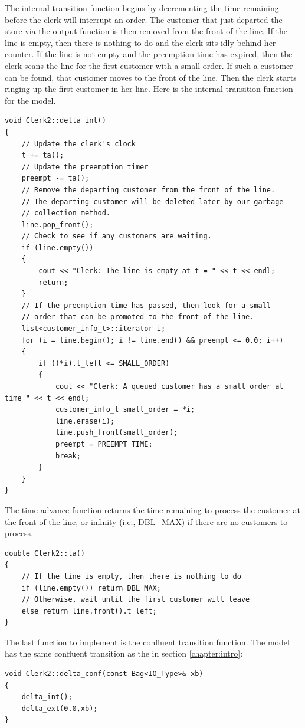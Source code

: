 The internal transition function begins by decrementing the time remaining before the clerk will interrupt an order. The customer that just departed the store via the output function is then removed from the front of the line. If the line is empty, then there is nothing to do and the clerk sits idly behind her counter. If the line is not empty and the preemption time has expired, then the clerk scans the line for the first customer with a small order. If such a customer can be found, that customer moves to the front of the line. Then the clerk starts ringing up the first customer in her line. Here is the internal transition function for the  model.
\begin{verbatim}
void Clerk2::delta_int()
{
    // Update the clerk's clock
    t += ta();
    // Update the preemption timer
    preempt -= ta();
    // Remove the departing customer from the front of the line.
    // The departing customer will be deleted later by our garbage
    // collection method.
    line.pop_front();
    // Check to see if any customers are waiting.
    if (line.empty())
    {
        cout << "Clerk: The line is empty at t = " << t << endl;
        return;
    }
    // If the preemption time has passed, then look for a small
    // order that can be promoted to the front of the line.
    list<customer_info_t>::iterator i;
    for (i = line.begin(); i != line.end() && preempt <= 0.0; i++)
    {
        if ((*i).t_left <= SMALL_ORDER)
        {
            cout << "Clerk: A queued customer has a small order at time " << t << endl;
            customer_info_t small_order = *i;
            line.erase(i);
            line.push_front(small_order);
            preempt = PREEMPT_TIME;
            break;
        }
    }
}
\end{verbatim}

The time advance function returns the time remaining to process the customer at the front of the line, or infinity (i.e., DBL\_MAX) if there are no customers to process.
\begin{verbatim}
double Clerk2::ta()
{
    // If the line is empty, then there is nothing to do
    if (line.empty()) return DBL_MAX;
    // Otherwise, wait until the first customer will leave
    else return line.front().t_left;
}
\end{verbatim}

The last function to implement is the confluent transition function. The  model has the same confluent transition as the  in section \ref{chapter:intro}:
\begin{verbatim}
void Clerk2::delta_conf(const Bag<IO_Type>& xb)
{
    delta_int();
    delta_ext(0.0,xb);
}
\end{verbatim}

